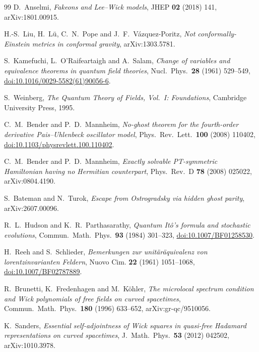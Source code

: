 \documentclass[11pt]{article}
\theoremstyle{definition}
\theoremstyle{remark}
\begin{document}
\begin{thebibliography}{99}
D.~Anselmi,
\emph{Fakeons and Lee--Wick models},
JHEP \textbf{02} (2018) 141,
arXiv:1801.00915.

H.-S.~Liu, H.~L\"u, C.~N.~Pope and J.~F.~V\'azquez-Poritz,
\emph{Not conformally-Einstein metrics in conformal gravity},
arXiv:1303.5781.

S.~Kamefuchi, L.~O'Raifeartaigh and A.~Salam,
\emph{Change of variables and equivalence theorems in quantum field
theories},
Nucl.\ Phys.\ \textbf{28} (1961) 529--549,
\href{https://doi.org/10.1016/0029-5582(61)90056-6}{doi:10.1016/0029-5582(61)90056-6}.

S.~Weinberg,
\emph{The Quantum Theory of Fields, Vol.~I: Foundations},
Cambridge University Press, 1995.

C.~M.~Bender and P.~D.~Mannheim,
\emph{No-ghost theorem for the fourth-order derivative Pais--Uhlenbeck
oscillator model},
Phys.\ Rev.\ Lett.\ \textbf{100} (2008) 110402,
\href{https://doi.org/10.1103/physrevlett.100.110402}{doi:10.1103/physrevlett.100.110402}.

C.~M.~Bender and P.~D.~Mannheim,
\emph{Exactly solvable PT-symmetric Hamiltonian having no Hermitian
counterpart},
Phys.\ Rev.\ D \textbf{78} (2008) 025022, arXiv:0804.4190.

S.~Bateman and N.~Turok,
\emph{Escape from Ostrogradsky via hidden ghost parity},
arXiv:2607.00096.

R.~L.~Hudson and K.~R.~Parthasarathy,
\emph{Quantum It\^o's formula and stochastic evolutions},
Commun.\ Math.\ Phys.\ \textbf{93} (1984) 301--323,
\href{https://doi.org/10.1007/BF01258530}{doi:10.1007/BF01258530}.

H.~Reeh and S.~Schlieder,
\emph{Bemerkungen zur unit\"ar\"aquivalenz von lorentzinvarianten Feldern},
Nuovo Cim. \textbf{22} (1961) 1051--1068,
\href{https://doi.org/10.1007/BF02787889}{doi:10.1007/BF02787889}.

R.~Brunetti, K.~Fredenhagen and M.~K\"ohler,
\emph{The microlocal spectrum condition and Wick polynomials of free fields
on curved spacetimes},
Commun.\ Math.\ Phys.\ \textbf{180} (1996) 633--652,
arXiv:gr-qc/9510056.

K.~Sanders,
\emph{Essential self-adjointness of Wick squares in quasi-free Hadamard
representations on curved spacetimes},
J.\ Math.\ Phys.\ \textbf{53} (2012) 042502,
arXiv:1010.3978.


\end{thebibliography}
\end{document}
